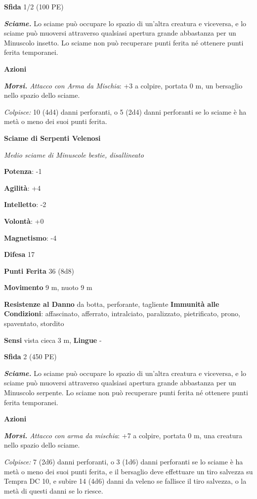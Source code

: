 \begin{multicols}{2}
\textbf{Sfida} 1/2 (100 PE)\smallskip

\emph{\textbf{Sciame.}} Lo sciame può occupare lo spazio di un'altra
creatura e viceversa, e lo sciame può muoversi attraverso qualsiasi
apertura grande abbastanza per un Minuscolo insetto. Lo sciame non può
recuperare punti ferita né ottenere punti ferita temporanei.

\smallskip\textbf{Azioni}

\emph{\textbf{Morsi.} Attacco con Arma da Mischia}: +3 a colpire,
portata 0 m, un bersaglio nello spazio dello sciame.

\emph{Colpisce:} 10 (4d4) danni perforanti, o 5 (2d4) danni perforanti
se lo sciame è ha metà o meno dei suoi punti ferita.



\textbf{Sciame di Serpenti Velenosi}

\emph{Medio sciame di Minuscole bestie, disallineato}

\textbf{Potenza}: -1

\textbf{Agilità}: +4

\textbf{Intelletto}: -2

\textbf{Volontà}: +0

\textbf{Magnetismo}: -4

\textbf{Difesa} 17

\textbf{Punti Ferita} 36 (8d8)

\textbf{Movimento} 9 m, nuoto 9 m

\textbf{Resistenze al Danno} da botta, perforante, tagliente
\textbf{Immunità alle Condizioni}: affascinato, afferrato, intralciato,
paralizzato, pietrificato, prono, spaventato, stordito

\textbf{Sensi} vista cieca 3 m,  \textbf{Lingue} -

\textbf{Sfida} 2 (450 PE)\smallskip

\emph{\textbf{Sciame.}} Lo sciame può occupare lo spazio di un'altra
creatura e viceversa, e lo sciame può muoversi attraverso qualsiasi
apertura grande abbastanza per un Minuscolo serpente. Lo sciame non può
recuperare punti ferita né ottenere punti ferita temporanei.

\smallskip\textbf{Azioni}

\emph{\textbf{Morsi.} Attacco con arma da mischia}: +7 a colpire,
portata 0 m, una creatura nello spazio dello sciame.

\emph{Colpisce:} 7 (2d6) danni perforanti, o 3 (1d6) danni perforanti se
lo sciame è ha metà o meno dei suoi punti ferita, e il bersaglio deve
effettuare un tiro salvezza su Tempra DC 10, e subire 14 (4d6)
danni da veleno se fallisce il tiro salvezza, o la metà di questi danni
se lo riesce.


\end{multicols}
